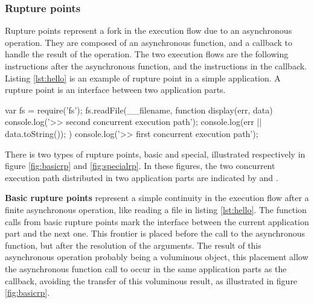 \subsubsection{Rupture points}

Rupture points represent a fork in the execution flow due to an asynchronous operation.
They are composed of an asynchronous function, and a callback to handle the result of the operation.
The two execution flows are the following instructions after the asynchronous function, and the instructions in the callback.
Listing \ref{lst:hello} is an example of rupture point in a simple application.
A rupture point is an interface between two application parts.

\begin{code}[Javascript, caption={Example of a rupture point : an asynchronous function call, \texttt{fs.readFile()}, with a callback parameter, \texttt{function display}},label={lst:hello}]
var fs = require('fs');
fs.readFile(__filename, function display(err, data) {
  console.log('>> second concurrent execution path');
  console.log(err || data.toString());
})
console.log('>> first concurrent execution path');
\end{code}


There is two types of rupture points, basic and special, illustrated respectively in figure \ref{fig:basicrp} and \ref{fig:specialrp}.
In these figures, the two concurrent execution path distributed in two application parts are indicated by  and .

\textbf{Basic rupture points} represent a simple continuity in the execution flow after a finite asynchronous operation, like reading a file in listing \ref{lst:hello}.
The function calls from basic rupture points mark the interface between the current application part and the next one.
This frontier is placed before the call to the asynchronous function, but after the resolution of the arguments.
The result of this asynchronous operation probably being a voluminous object, this placement allow the asynchronous function call to occur in the same application parts as the callback, avoiding the transfer of this voluminous result, as illustrated in figure \ref{fig:basicrp}.

